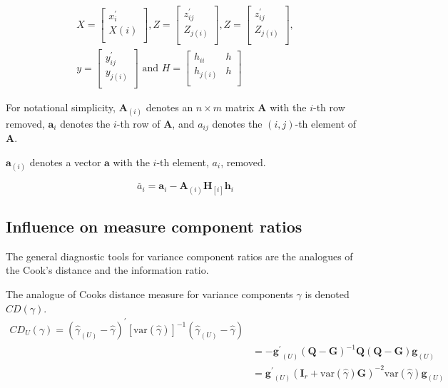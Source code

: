 \documentclass[12pt, a4paper]{report}
\theoremstyle{plain}
\theoremstyle{definition}
\theoremstyle{remark}
\begin{document}
\begin{eqnarray*}
	X= \left[%
	\begin{array}{c}
		x^\prime_{i} \\
		X(i) \\
	\end{array}%
	\right],
	Z= \left[%
	\begin{array}{c}
		z^\prime_{ij} \\
		Z_{j(i)} \\
	\end{array}%
	\right] ,
	Z = \left[%
	\begin{array}{c}
		z^\prime_{ij} \\
		Z_{j(i)} \\
	\end{array}%
	\right], \\
	y = \left[%
	\begin{array}{c}
		y^\prime_{ij} \\
		y_{j(i)} \\
	\end{array}%
	\right]
	\mbox{ and } H = \left[%
	\begin{array}{cc}
		h_{ii}& h\\
		h_{j(i)} & h\\
	\end{array}%
	\right]
\end{eqnarray*}

For notational simplicity, $\boldsymbol{A}_{(i)}$ denotes an $n
\times m$ matrix  $\boldsymbol{A}$ with the $i$-th row removed,
$\boldsymbol{a}_{i}$ denotes the $i$-th row of $\boldsymbol{A}$,
and $a_{ij}$ denotes the $(i, j)$-th element of $\boldsymbol{A}$.

$\boldsymbol{a}_{(i)}$ denotes a vector $\boldsymbol{a}$ with the $i$-th element, $a_{i}$, removed.

\begin{equation}
\breve{a_{i}} =  \boldsymbol{a}_{i} -
\boldsymbol{A}_{(i)}\boldsymbol{H}_{[i]}\boldsymbol{h}_{i}
\end{equation}

\subsection{Influence on measure component ratios}               %
The general diagnostic tools for variance component ratios are the analogues of the Cook's distance and the information ratio.

The analogue of Cooks distance measure for variance components $\gamma$ is denoted $CD(\gamma)$.
\begin{eqnarray*}
	CD_{U}(\gamma) = (\hat{\gamma}_{(U)} - \hat{\gamma})^{\prime}[\mbox{var}(\hat{\gamma})]^{-1}(\hat{\gamma}_{(U)} - \hat{\gamma})\\
	&= -\boldsymbol{g^{\prime}}_{(U)} (\boldsymbol{Q}-\boldsymbol{G})^{-1}\boldsymbol{Q}(\boldsymbol{Q}-\boldsymbol{G})\boldsymbol{g}_{(U)} \\
	&= \boldsymbol{g^{\prime}}_{(U)} (\boldsymbol{I}_{r} + \mbox{var}(\hat{\gamma})\boldsymbol{G})^{-2}\mbox{var}(\hat{\gamma})\boldsymbol{g}_{(U)}
\end{eqnarray*}
\end{document}
